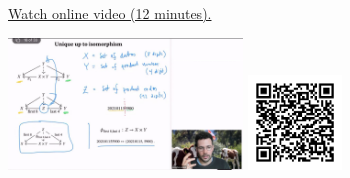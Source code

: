 
\begin{minipage}{10cm}
    \href{https://act4e-spring21.netlify.app/videos/spring2021-products:products:cat-prod:def-prof.html}{Watch online video (12 minutes).}
        
    \href{https://act4e-spring21.netlify.app/videos/spring2021-products:products:cat-prod:def-prof.html}{\includegraphics[height=3.5cm]{spring2021-products:products:cat-prod:def-prof/thumbnails.jpg}}
    \href{https://act4e-spring21.netlify.app/videos/spring2021-products:products:cat-prod:def-prof.html}{\includegraphics[height=2.5cm]{spring2021-products:products:cat-prod:def-prof/qrcode.png}}
\end{minipage}
